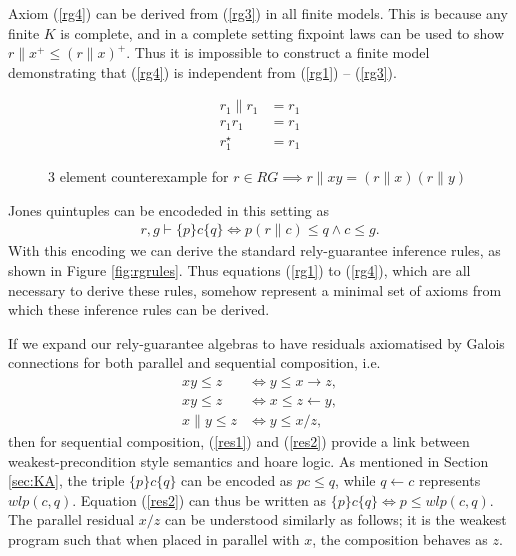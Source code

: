 \documentclass{llncs}
\begin{document}
Axiom (\ref{rg4}) can be derived from (\ref{rg3}) in all finite
models. This is because any finite $K$ is complete, and in a complete
setting fixpoint laws can be used to show $r\|x^+ \le (r\|x)^+$. Thus
it is impossible to construct a finite model demonstrating that
(\ref{rg4}) is independent from (\ref{rg1}) -- (\ref{rg3}).

\begin{figure}[t]
\centering
\begin{minipage}{0.24\textwidth}
\end{minipage}
\begin{minipage}{0.24\textwidth}
\begin{align*}
r_1 \| r_1 &= r_1\\
r_1 r_1 &= r_1\\
r_1^\star &= r_1
\end{align*}
\end{minipage}
\caption{3 element counterexample for $r \in RG \implies r\|xy = (r\|x)(r\|y)$}
\label{fig:rg3}
\end{figure}

Jones quintuples can be encodeded in this setting as
\begin{align}
r, g \vdash \{p\} c \{q\} \iff p(r\|c) \le q \land c \le g. \label{quin}
\end{align}
With this encoding we can derive the standard rely-guarantee inference
rules, as shown in Figure \ref{fig:rgrules}. Thus equations
(\ref{rg1}) to (\ref{rg4}), which are all necessary to derive these
rules, somehow represent a minimal set of axioms from which these
inference rules can be derived.

If we expand our rely-guarantee algebras to have residuals axiomatised
by Galois connections for both parallel and sequential composition,
i.e.
\begin{align}
xy \le z &\iff y \le x \rightarrow z, \label{res1}\\
xy \le z &\iff x \le z \leftarrow y, \label{res2}\\
x\|y \le z &\iff y \le x/z \label{res3},
\end{align}
then for sequential composition, (\ref{res1}) and (\ref{res2}) provide
a link between weakest-precondition style semantics and hoare
logic. As mentioned in Section \ref{sec:KA}, the triple $\{p\} c
\{q\}$ can be encoded as $pc \le q$, while $q \leftarrow c$ represents
$wlp(c,q)$. Equation (\ref{res2}) can thus be written as $\{p\} c
\{q\} \iff p \le wlp(c,q)$. The parallel residual $x/z$ can be
understood similarly as follows; it is the weakest program such that
when placed in parallel with $x$, the composition behaves as $z$.
\end{document}
